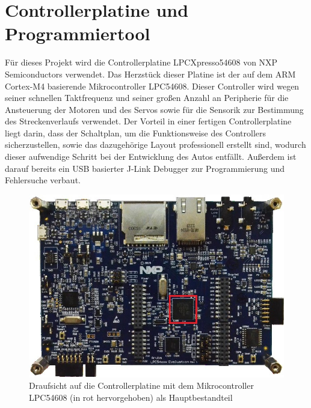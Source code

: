 

\pagestyle{fancy}
\rhead{\thepage} \chead{} 
\cfoot{}

\section{Controllerplatine und Programmiertool}\label{Sec3}

Für dieses Projekt wird die Controllerplatine LPCXpresso54608 von NXP Semiconductors verwendet. Das Herzstück dieser Platine ist der auf dem ARM Cortex-M4 basierende Mikrocontroller LPC54608. Dieser Controller wird wegen seiner schnellen Taktfrequenz und seiner großen Anzahl an Peripherie für die Ansteuerung der Motoren und des Servos sowie für die Sensorik zur Bestimmung des Streckenverlaufs verwendet. Der Vorteil in einer fertigen Controllerplatine liegt darin, dass der Schaltplan, um die Funktionsweise des Controllers sicherzustellen, sowie das dazugehörige Layout professionell erstellt sind, wodurch dieser aufwendige Schritt bei der Entwicklung des Autos entfällt. Außerdem ist darauf bereits ein USB basierter J-Link Debugger zur Programmierung und Fehlersuche verbaut.

\begin{figure}[H] %
	\includegraphics[width=.90\textwidth]{sec3/images/Controllerplatine} 
	\centering
	\captionsetup{width=.95\textwidth}
	\caption[Controllerplatine LPCXpresso54608 ~\protect\cite{Semic}]{Draufsicht auf die Controllerplatine mit dem Mikrocontroller LPC54608  (in rot hervorgehoben) als Hauptbestandteil ~\protect\cite{Semic}}\centering
	\label{fig:Controllerplatine}
\end{figure}


